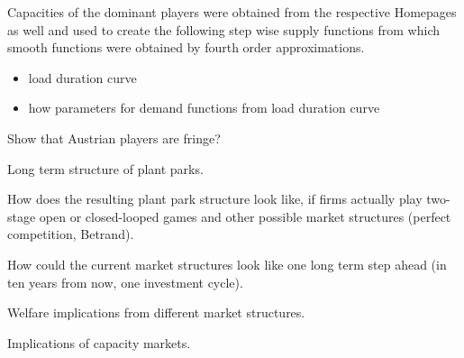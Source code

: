 Capacities of the dominant players were obtained from the respective Homepages as well and used to create the following step wise supply functions from which smooth functions were obtained by fourth order approximations.


\begin{itemize}
\item load duration curve
\item how parameters for demand functions from load duration curve
\end{itemize}

Show that Austrian players are fringe? 

Long term structure of plant parks.

How does the resulting plant park structure look like, if firms actually play two-stage open or closed-looped games and other possible market structures (perfect competition, Betrand). 

How could the current market structures look like one long term step ahead (in ten years from now, one investment cycle).

Welfare implications from different market structures.

Implications of capacity markets.


